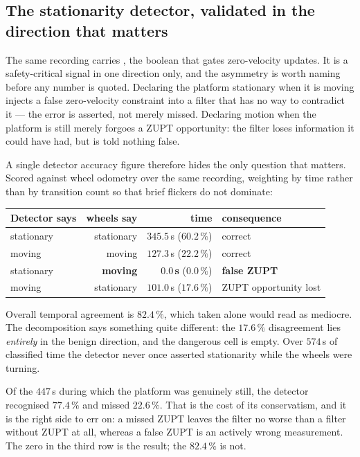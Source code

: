 \subsection{The stationarity detector, validated in the direction that matters}
\label{sec:zuptvalid}

The same recording carries , the boolean
that gates zero-velocity updates. It is a safety-critical signal in one
direction only, and the asymmetry is worth naming before any number is
quoted. Declaring the platform stationary when it is moving injects a false
zero-velocity constraint into a filter that has no way to contradict it ---
the error is asserted, not merely missed. Declaring motion when the platform
is still merely forgoes a ZUPT opportunity: the filter loses information it
could have had, but is told nothing false.

A single detector accuracy figure therefore hides the only question that
matters. Scored against wheel odometry over the same recording, weighting by
time rather than by transition count so that brief flickers do not dominate:

\begin{center}
\begin{tabular}{@{}lrrl@{}}
\toprule
Detector says & wheels say & time & consequence \\
\midrule
stationary & stationary & $345.5$\,s  ($60.2\,\%$) & correct \\
moving     & moving     & $127.3$\,s  ($22.2\,\%$) & correct \\
stationary & \textbf{moving} & $\mathbf{0.0}$\,\textbf{s}  ($0.0\,\%$) & \textbf{false ZUPT} \\
moving     & stationary & $101.0$\,s  ($17.6\,\%$) & ZUPT opportunity lost \\
\bottomrule
\end{tabular}
\end{center}

\noindent Overall temporal agreement is $82.4\,\%$, which taken alone would
read as mediocre. The decomposition says something quite different: the
$17.6\,\%$ disagreement lies \emph{entirely} in the benign direction, and
the dangerous cell is empty. Over $574$\,s of classified time the detector
never once asserted stationarity while the wheels were turning.

Of the $447$\,s during which the platform was genuinely still, the detector
recognised $77.4\,\%$ and missed $22.6\,\%$. That is the cost of its
conservatism, and it is the right side to err on: a missed ZUPT leaves the
filter no worse than a filter without ZUPT at all, whereas a false ZUPT is
an actively wrong measurement. The zero in the third row is the result;
the $82.4\,\%$ is not.


